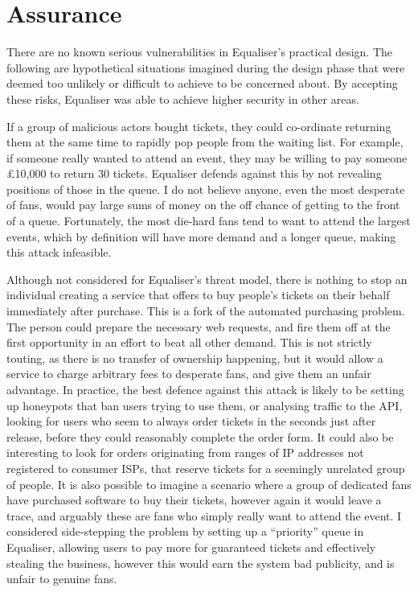 \documentclass[12pt,a4paper]{bhamdissertation}
\begin{document}
\section{Assurance}

There are no known serious vulnerabilities in Equaliser's practical design. The following are hypothetical situations imagined during the design phase that were deemed too unlikely or difficult to achieve to be concerned about. By accepting these risks, Equaliser was able to achieve higher security in other areas.

If a group of malicious actors bought tickets, they could co-ordinate returning them at the same time to rapidly pop people from the waiting list. For example, if someone really wanted to attend an event, they may be willing to pay someone £10,000 to return 30 tickets. Equaliser defends against this by not revealing positions of those in the queue. I do not believe anyone, even the most desperate of fans, would pay large sums of money on the off chance of getting to the front of a queue. Fortunately, the most die-hard fans tend to want to attend the largest events, which by definition will have more demand and a longer queue, making this attack infeasible.

Although not considered for Equaliser's threat model, there is nothing to stop an individual creating a service that offers to buy people's tickets on their behalf immediately after purchase. This is a fork of the automated purchasing problem. The person could prepare the necessary web requests, and fire them off at the first opportunity in an effort to beat all other demand. This is not strictly touting, as there is no transfer of ownership happening, but it would allow a service to charge arbitrary fees to desperate fans, and give them an unfair advantage. In practice, the best defence against this attack is likely to be setting up honeypots that ban users trying to use them, or analysing traffic to the API, looking for users who seem to always order tickets in the seconds just after release, before they could reasonably complete the order form. It could also be interesting to look for orders originating from ranges of IP addresses not registered to consumer ISPs, that reserve tickets for a seemingly unrelated group of people. It is also possible to imagine a scenario where a group of dedicated fans have purchased software to buy their tickets, however again it would leave a trace, and arguably these are fans who simply really want to attend the event. I considered side-stepping the problem by setting up a ``priority'' queue in Equaliser, allowing users to pay more for guaranteed tickets and effectively stealing the business, however this would earn the system bad publicity, and is unfair to genuine fans.
\end{document}
